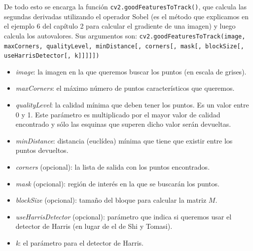 \documentclass[a4paper,openright, 12pt]{book}
\begin{document}
De todo esto se encarga la función \lstinline|cv2.goodFeaturesToTrack()|, que calcula las segundas derivadas utilizando el operador Sobel (es el método que explicamos en el ejemplo 6 del capítulo 2 para calcular el gradiente de una imagen) y luego calcula los autovalores.
Sus argumentos son:
\newline
\lstinline|cv2.goodFeaturesToTrack(image, maxCorners, qualityLevel, minDistance[, corners[, mask[, blockSize[, useHarrisDetector[, k]]]]]) |
\begin{itemize}
\item \textit{image}: la imagen en la que queremos buscar los puntos (en escala de grises).
\item \textit{maxCorners}:  el máximo número de puntos característicos que queremos.
\item \textit{qualityLevel}: la calidad mínima que deben tener los puntos. Es un valor entre 0 y 1. Este parámetro es multiplicado por el mayor valor de calidad encontrado y sólo las esquinas que superen dicho valor serán devueltas.
\item \textit{minDistance}: distancia (euclídea) mínima que tiene que existir entre los puntos devueltos.
\item \textit{corners} (opcional): la lista de salida con los puntos encontrados.
\item \textit{mask} (opcional): región de interés en la que se buscarán los puntos.
\item \textit{blockSize} (opcional): tamaño del bloque para calcular la matriz $M$.
\item \textit{useHarrisDetector} (opcional): parámetro que indica si queremos usar el detector de Harris (en lugar de el de Shi y Tomasi).
\item \textit{k}: el parámetro para el detector de Harris.
\end{itemize}

\newpage
\end{document}

